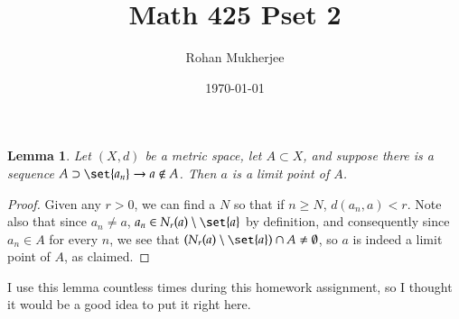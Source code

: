 \documentclass[12pt]{article}
\title{Math 425 Pset 2}
\date{\today}
\author{Rohan Mukherjee}
\newtheorem{lemma}[theorem]{Lemma}
\theoremstyle{definition}
\theoremstyle{remark}
\begin{document}
	\maketitle
	
	\begin{lemma}
		Let $(X, d)$ be a metric space, let $A \subset X$, and suppose there is a sequence $A \supset \set{a_n} \to a \not \in A$. Then $a$ is a limit point of $A$.	
	\end{lemma}
	\begin{proof}
		Given any $r > 0$, we can find a $N$ so that if $n \geq N$, $d(a_n, a) < r$. Note also that since $a_n \neq a$, $a_n \in N_r(a) \setminus \set{a}$ by definition, and consequently since $a_n \in A$ for every $n$, we see that $(N_r(a) \setminus \set{a}) \cap A \neq \emptyset$, so $a$ is indeed a limit point of $A$, as claimed.
	\end{proof}
	I use this lemma countless times during this homework assignment, so I thought it would be a good idea to put it right here.
\end{document}
